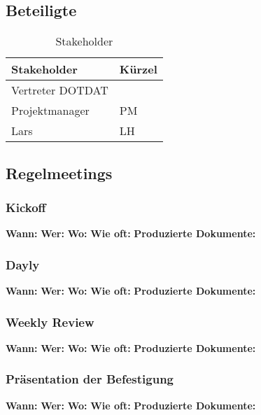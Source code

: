 \subsection{Beteiligte}
\begin{table}[H]
    \renewcommand{\arraystretch}{1.1}
    \begin{center}
        \begin{tabular}{l|l}
            \textbf{Stakeholder} & \textbf{Kürzel}\\\hline
            Vertreter DOTDAT & \\
            Projektmanager & PM\\
            Lars & LH\\
            
            
            
            
            
        \end{tabular}
    \end{center}
    \caption{Stakeholder}
\end{table}
\subsection{Regelmeetings}
 
\subsubsection{Kickoff}
\textbf{Wann:} 
\textbf{Wer:}
\textbf{Wo:}
\textbf{Wie oft:}
\textbf{Produzierte Dokumente:}


\subsubsection{Dayly}
\textbf{Wann:} 
\textbf{Wer:}
\textbf{Wo:}
\textbf{Wie oft:}
\textbf{Produzierte Dokumente:}

\subsubsection{Weekly Review}
\textbf{Wann:} 
\textbf{Wer:}
\textbf{Wo:}
\textbf{Wie oft:}
\textbf{Produzierte Dokumente:}

\subsubsection{Präsentation der Befestigung}
\textbf{Wann:} 
\textbf{Wer:}
\textbf{Wo:}
\textbf{Wie oft:}
\textbf{Produzierte Dokumente:}

